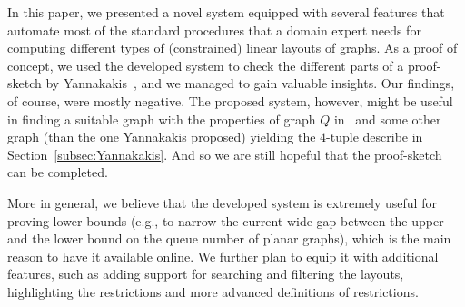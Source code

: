 \documentclass[runningheads]{llncs}
\begin{document}
In this paper, we presented a novel system equipped with several features that automate most of the standard procedures that a domain expert needs for computing different types of (constrained) linear layouts of graphs. As a proof of concept, we used the developed system to check the different parts of a proof-sketch by Yannakakis~\cite{DBLP:conf/stoc/Yannakakis86}, and we managed to gain valuable insights. Our findings, of course, were mostly negative. The proposed system, however, might be useful in finding a suitable graph with the properties of graph $Q$ in~\cite{DBLP:conf/stoc/Yannakakis86} and some other graph (than the one Yannakakis proposed) yielding the $4$-tuple describe in Section~\ref{subsec:Yannakakis}. And so we are still hopeful that the proof-sketch can be completed. 

More in general, we believe that the developed system is extremely useful for proving lower bounds (e.g., to narrow the current wide gap between the upper and the lower bound on the queue number of planar graphs), which is the main reason to have it available online. We further plan to equip it with additional features, such as adding support for searching and filtering the layouts, highlighting the restrictions and more advanced definitions of restrictions.



\end{document}
